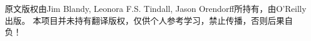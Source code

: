 \thispagestyle{empty}

\maketitle

\newpage
\thispagestyle{empty}

\begin{flushleft}\footnotesize
    原文版权由Jim Blandy, Leonora F.S. Tindall, Jason Orendorff所持有，由O'Reilly出版。
    本项目并未持有翻译版权，仅供个人参考学习，禁止传播，否则后果自负！
\end{flushleft}
